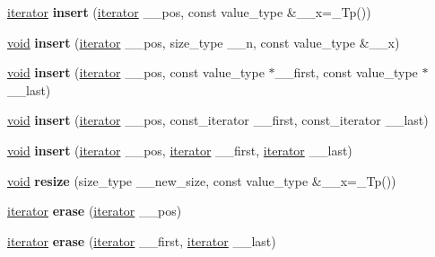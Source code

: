 \begin{DoxyCompactItemize}
\item 
\mbox{\label{classdeque_ae404110a7d92f989958139f8bff0fd19}} 
\hyperlink{structiterator}{iterator} {\bfseries insert} (\hyperlink{structiterator}{iterator} \+\_\+\+\_\+pos, const value\+\_\+type \&\+\_\+\+\_\+x=\+\_\+\+Tp())
\item 
\mbox{\label{classdeque_ac4bfac374cf3c088591ca63ad9855ed6}} 
\hyperlink{interfacevoid}{void} {\bfseries insert} (\hyperlink{structiterator}{iterator} \+\_\+\+\_\+pos, size\+\_\+type \+\_\+\+\_\+n, const value\+\_\+type \&\+\_\+\+\_\+x)
\item 
\mbox{\label{classdeque_ab9e7e01d3af439329bd6c9b78f349645}} 
\hyperlink{interfacevoid}{void} {\bfseries insert} (\hyperlink{structiterator}{iterator} \+\_\+\+\_\+pos, const value\+\_\+type $\ast$\+\_\+\+\_\+first, const value\+\_\+type $\ast$\+\_\+\+\_\+last)
\item 
\mbox{\label{classdeque_aeefb933214dbfacf968ebbe4fce9a154}} 
\hyperlink{interfacevoid}{void} {\bfseries insert} (\hyperlink{structiterator}{iterator} \+\_\+\+\_\+pos, const\+\_\+iterator \+\_\+\+\_\+first, const\+\_\+iterator \+\_\+\+\_\+last)
\item 
\mbox{\label{classdeque_abd436c7a58c9b7d751f01714874b7b60}} 
\hyperlink{interfacevoid}{void} {\bfseries insert} (\hyperlink{structiterator}{iterator} \+\_\+\+\_\+pos, \hyperlink{structiterator}{iterator} \+\_\+\+\_\+first, \hyperlink{structiterator}{iterator} \+\_\+\+\_\+last)
\item 
\mbox{\label{classdeque_a485aa69a9954cc2b00a7eed4e65affaf}} 
\hyperlink{interfacevoid}{void} {\bfseries resize} (size\+\_\+type \+\_\+\+\_\+new\+\_\+size, const value\+\_\+type \&\+\_\+\+\_\+x=\+\_\+\+Tp())
\item 
\mbox{\label{classdeque_a0c84b0b6e601140132de6324489f0b4d}} 
\hyperlink{structiterator}{iterator} {\bfseries erase} (\hyperlink{structiterator}{iterator} \+\_\+\+\_\+pos)
\item 
\mbox{\label{classdeque_a745e68373354ed0bab1ed5edec114c01}} 
\hyperlink{structiterator}{iterator} {\bfseries erase} (\hyperlink{structiterator}{iterator} \+\_\+\+\_\+first, \hyperlink{structiterator}{iterator} \+\_\+\+\_\+last)

\end{DoxyCompactItemize}
